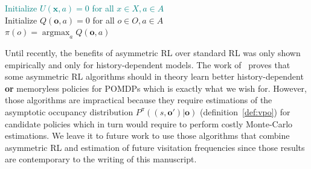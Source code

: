 \begin{algorithm}
    \textcolor{teal}{Initialize $U(\boldsymbol{x},a) = 0$ for all $x \in X, a \in A$ \\}
    Initialize $Q(\boldsymbol{o},a) = 0$ for all $o \in O, a \in A$ \\
    $\pi(o) = \operatorname{argmax}_a Q(\boldsymbol{o},a)$
    \caption{Asymmetric Q-Learning~\citep{baisero-dqn}. We highlight in green the differences with the standard Q-learning~\citep{watkins1992q}.}\label{alg:asymqlearning}
\end{algorithm}

Until recently, the benefits of asymmetric RL over standard RL was only shown empirically and only for history-dependent models.
The work of~\cite{justif-asym} proves that some asymmetric RL algorithms should in theory learn better history-dependent \textbf{or} memoryless policies for POMDPs which is exactly what we wish for.
However, those algorithms are impractical because they require estimations of the asymptotic occupancy distribution $P^{\pi}((s, \boldsymbol{o}')|\boldsymbol{o})$ (definition~\ref{def:vpo}) for candidate policies which in turn would require to perform costly Monte-Carlo estimations.
We leave it to future work to use those algorithms that combine asymmetric RL and estimation of future visitation frequencies since those results are contemporary to the writing of this manuscript.

